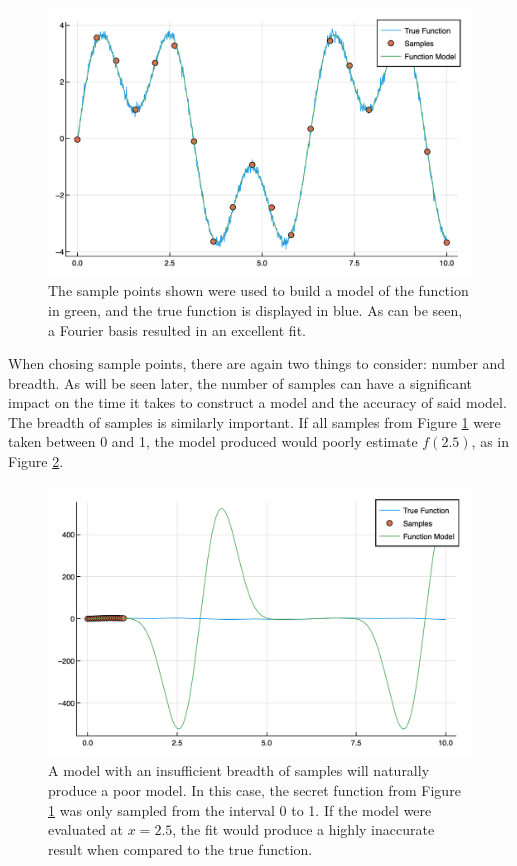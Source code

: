 \begin{figure}[h]
\includegraphics[scale = 0.27]{Figures/2dFourier}
\caption{The sample points shown were used to build a model of the function in green, and the true function is displayed in blue. As can be seen, a Fourier basis resulted in an excellent fit. 
\label{fig:2dFourier}} 
\end{figure}

\par When chosing sample points, there are again two things to consider: number and breadth. As will be seen later, the number of samples can have a significant impact on the time it takes to construct a model and the accuracy of said model. The breadth of samples is similarly important. If all samples from Figure \ref{fig:2dFourier} were taken between 0 and 1, the model produced would poorly estimate $f(2.5)$, as in Figure \ref{fig:poorSamps}. 

\begin{figure}[h]
\includegraphics[scale = 0.4]{Figures/poorSamps}
\caption{A model with an insufficient breadth of samples will naturally produce a poor model. In this case, the secret function from Figure \ref{fig:2dFourier} was only sampled from the interval 0 to 1. If the model were evaluated at $x=2.5$, the fit would produce a highly inaccurate result when compared to the true function.
\label{fig:poorSamps}} 
\end{figure}

